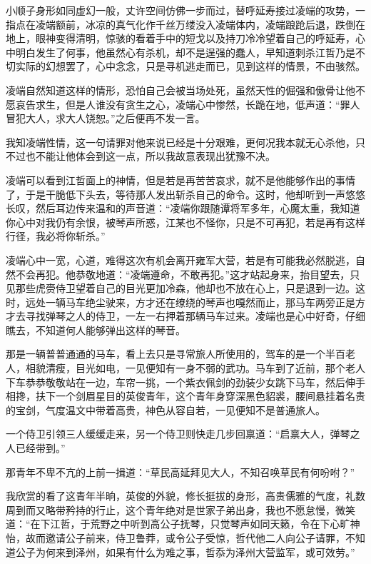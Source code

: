 小顺子身形如同虚幻一般，丈许空间仿佛一步而过，替呼延寿接过凌端的攻势，一指点在凌端额前，冰凉的真气化作千丝万缕没入凌端体内，凌端踉跄后退，跌倒在地上，眼神变得清明，惊骇的看着手中的短戈以及持刀冷冷望着自己的呼延寿，心中明白发生了何事，他虽然心有杀机，却不是逞强的蠢人，早知道刺杀江哲乃是不切实际的幻想罢了，心中念念，只是寻机逃走而已，见到这样的情景，不由骇然。

凌端自然知道这样的情形，恐怕自己会被当场处死，虽然天性的倔强和傲骨让他不愿哀告求生，但是人谁没有贪生之心，凌端心中惨然，长跪在地，低声道：“罪人冒犯大人，求大人饶恕。”之后便再不发一言。

我知凌端性情，这一句请罪对他来说已经是十分艰难，更何况我本就无心杀他，只不过也不能让他体会到这一点，所以我故意表现出犹豫不决。

凌端可以看到江哲面上的神情，但是若是再苦苦哀求，就不是他能够作出的事情了，于是干脆低下头去，等待那人发出斩杀自己的命令。这时，他却听到一声悠悠长叹，然后耳边传来温和的声音道：“凌端你跟随谭将军多年，心魔太重，我知道你心中对我仍有余恨，被琴声所惑，江某也不怪你，只是不可再犯，若是再有这样行径，我必将你斩杀。”

凌端心中一宽，心道，难得这次有机会离开雍军大营，若是有可能我必然脱逃，自然不会再犯。他恭敬地道：“凌端遵命，不敢再犯。”这才站起身来，抬目望去，只见那些虎赍侍卫望着自己的目光更加冷森，他却也不放在心上，只是退到一边。这时，远处一辆马车绝尘驶来，方才还在缭绕的琴声也嘎然而止，那马车两旁正是方才去寻找弹琴之人的侍卫，一左一右押着那辆马车过来。凌端也是心中好奇，仔细瞧去，不知道何人能够弹出这样的琴音。

那是一辆普普通通的马车，看上去只是寻常旅人所使用的，驾车的是一个半百老人，相貌清瘦，目光如电，一见便知有一身不弱的武功。马车到了近前，那个老人下车恭恭敬敬站在一边，车帘一挑，一个紫衣佩剑的劲装少女跳下马车，然后伸手相搀，扶下一个剑眉星目的英俊青年，这个青年身穿深黑色貂裘，腰间悬挂着名贵的宝剑，气度温文中带着高贵，神色从容自若，一见便知不是普通旅人。

一个侍卫引领三人缓缓走来，另一个侍卫则快走几步回禀道：“启禀大人，弹琴之人已经带到。”

那青年不卑不亢的上前一揖道：“草民高延拜见大人，不知召唤草民有何吩咐？”

我欣赏的看了这青年半晌，英俊的外貌，修长挺拔的身形，高贵儒雅的气度，礼数周到而又略带矜持的行止，这个青年绝对是世家子弟出身，我也不愿怠慢，微笑道：“在下江哲，于荒野之中听到高公子抚琴，只觉琴声如同天籁，令在下心旷神怡，故而邀请公子前来，侍卫鲁莽，或令公子受惊，哲代他二人向公子请罪，不知道公子为何来到泽州，如果有什么为难之事，哲忝为泽州大营监军，或可效劳。”

